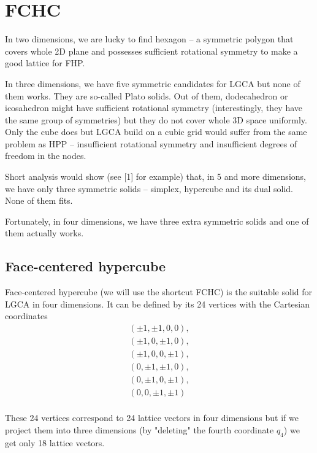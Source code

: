 \chapter{FCHC}

In two dimensions, we are lucky to find hexagon -- a symmetric polygon that covers whole 2D plane and possesses sufficient rotational symmetry to make a good lattice for FHP.

In three dimensions, we have five symmetric candidates for LGCA but none of them works.
They are so-called Plato solids. Out of them, dodecahedron or icosahedron might have sufficient rotational symmetry (interestingly, they have the same group of symmetries)
but they do not cover whole 3D space uniformly. Only the cube does but LGCA build on a cubic grid would suffer from the same problem as HPP -- insufficient rotational symmetry and insufficient degrees of freedom in the nodes.

Short analysis would show (see [1] for example) that, in 5 and more dimensions, we have only three symmetric solids -- simplex, hypercube and its dual solid. None of them fits.

\bigskip

Fortunately, in four dimensions, we have three extra symmetric solids and one of them actually works.

\section{Face-centered hypercube}
Face-centered hypercube (we will use the shortcut FCHC) is the suitable solid for LGCA in four dimensions. It can be defined by its 24 vertices with the Cartesian coordinates
\begin{equation}
\begin{split}
(\pm 1,\pm 1, 0, 0),\\
(\pm 1,0,\pm 1, 0),\\
(\pm 1,0,0,\pm 1),\\
(0, \pm 1,\pm 1, 0),\\
(0, \pm 1,0,\pm 1),\\
(0,0,\pm 1,\pm 1)\\
\end{split}
\end{equation}

These 24 vertices correspond to 24 lattice vectors in four dimensions but if we project them into three dimensions (by "deleting" the fourth coordinate $q_4$) we get only 18 lattice vectors.

